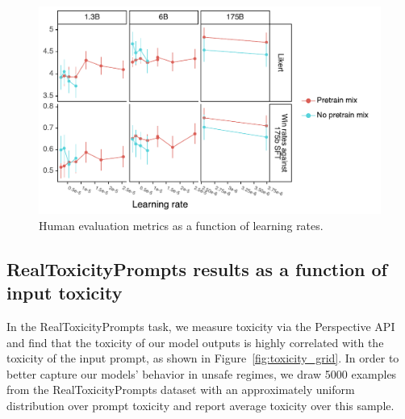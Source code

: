 \documentclass{article}
\begin{document}
\begin{figure}
    \centering
    \includegraphics[width=0.9\linewidth]{figs/human-evals-v-lrs.pdf}
    \caption{Human evaluation metrics as a function of learning rates.}
    \label{fig:human-evals-v-lrs}
\end{figure}


\subsection{RealToxicityPrompts results as a function of input toxicity}

In the RealToxicityPrompts task, we measure toxicity via the Perspective API and find that the toxicity of our model outputs is highly correlated with the toxicity of the input prompt, as shown in Figure~\ref{fig:toxicity_grid}. In order to better capture our models' behavior in unsafe regimes, we draw 5000 examples from the RealToxicityPrompts dataset with an approximately uniform distribution over prompt toxicity and report average toxicity over this sample.
\end{document}
